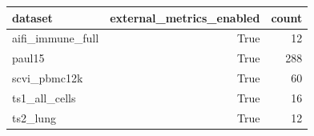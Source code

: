 \begin{tabular}{lrr}
\toprule
dataset & external\_metrics\_enabled & count \\
\midrule
aifi\_immune\_full & True & 12 \\
paul15 & True & 288 \\
scvi\_pbmc12k & True & 60 \\
ts1\_all\_cells & True & 16 \\
ts2\_lung & True & 12 \\
\bottomrule
\end{tabular}

